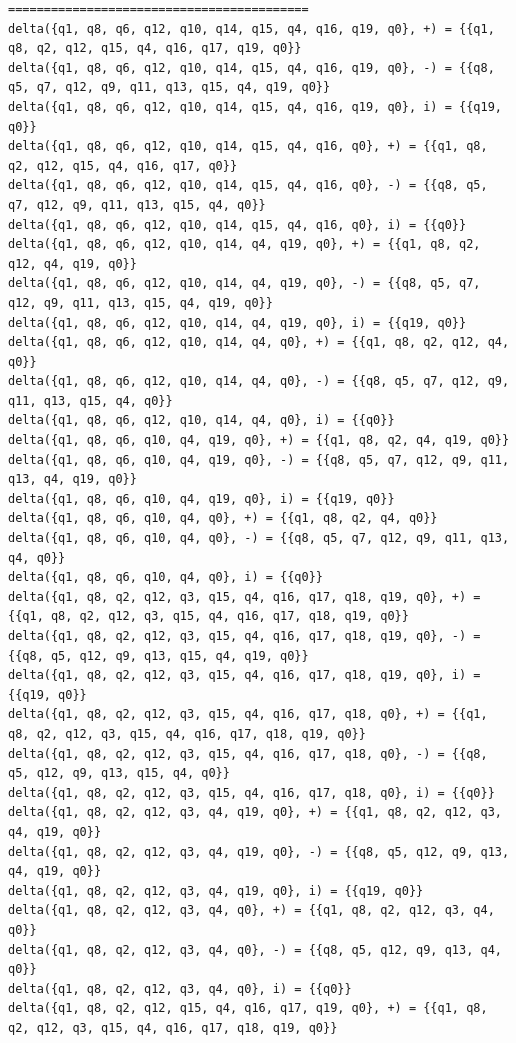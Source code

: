 \documentclass[12pt,a4paper]{report}
\begin{document}
\begin{lstlisting}
==========================================
delta({q1, q8, q6, q12, q10, q14, q15, q4, q16, q19, q0}, +) = {{q1, q8, q2, q12, q15, q4, q16, q17, q19, q0}}
delta({q1, q8, q6, q12, q10, q14, q15, q4, q16, q19, q0}, -) = {{q8, q5, q7, q12, q9, q11, q13, q15, q4, q19, q0}}
delta({q1, q8, q6, q12, q10, q14, q15, q4, q16, q19, q0}, i) = {{q19, q0}}
delta({q1, q8, q6, q12, q10, q14, q15, q4, q16, q0}, +) = {{q1, q8, q2, q12, q15, q4, q16, q17, q0}}
delta({q1, q8, q6, q12, q10, q14, q15, q4, q16, q0}, -) = {{q8, q5, q7, q12, q9, q11, q13, q15, q4, q0}}
delta({q1, q8, q6, q12, q10, q14, q15, q4, q16, q0}, i) = {{q0}}
delta({q1, q8, q6, q12, q10, q14, q4, q19, q0}, +) = {{q1, q8, q2, q12, q4, q19, q0}}
delta({q1, q8, q6, q12, q10, q14, q4, q19, q0}, -) = {{q8, q5, q7, q12, q9, q11, q13, q15, q4, q19, q0}}
delta({q1, q8, q6, q12, q10, q14, q4, q19, q0}, i) = {{q19, q0}}
delta({q1, q8, q6, q12, q10, q14, q4, q0}, +) = {{q1, q8, q2, q12, q4, q0}}
delta({q1, q8, q6, q12, q10, q14, q4, q0}, -) = {{q8, q5, q7, q12, q9, q11, q13, q15, q4, q0}}
delta({q1, q8, q6, q12, q10, q14, q4, q0}, i) = {{q0}}
delta({q1, q8, q6, q10, q4, q19, q0}, +) = {{q1, q8, q2, q4, q19, q0}}
delta({q1, q8, q6, q10, q4, q19, q0}, -) = {{q8, q5, q7, q12, q9, q11, q13, q4, q19, q0}}
delta({q1, q8, q6, q10, q4, q19, q0}, i) = {{q19, q0}}
delta({q1, q8, q6, q10, q4, q0}, +) = {{q1, q8, q2, q4, q0}}
delta({q1, q8, q6, q10, q4, q0}, -) = {{q8, q5, q7, q12, q9, q11, q13, q4, q0}}
delta({q1, q8, q6, q10, q4, q0}, i) = {{q0}}
delta({q1, q8, q2, q12, q3, q15, q4, q16, q17, q18, q19, q0}, +) = {{q1, q8, q2, q12, q3, q15, q4, q16, q17, q18, q19, q0}}
delta({q1, q8, q2, q12, q3, q15, q4, q16, q17, q18, q19, q0}, -) = {{q8, q5, q12, q9, q13, q15, q4, q19, q0}}
delta({q1, q8, q2, q12, q3, q15, q4, q16, q17, q18, q19, q0}, i) = {{q19, q0}}
delta({q1, q8, q2, q12, q3, q15, q4, q16, q17, q18, q0}, +) = {{q1, q8, q2, q12, q3, q15, q4, q16, q17, q18, q19, q0}}
delta({q1, q8, q2, q12, q3, q15, q4, q16, q17, q18, q0}, -) = {{q8, q5, q12, q9, q13, q15, q4, q0}}
delta({q1, q8, q2, q12, q3, q15, q4, q16, q17, q18, q0}, i) = {{q0}}
delta({q1, q8, q2, q12, q3, q4, q19, q0}, +) = {{q1, q8, q2, q12, q3, q4, q19, q0}}
delta({q1, q8, q2, q12, q3, q4, q19, q0}, -) = {{q8, q5, q12, q9, q13, q4, q19, q0}}
delta({q1, q8, q2, q12, q3, q4, q19, q0}, i) = {{q19, q0}}
delta({q1, q8, q2, q12, q3, q4, q0}, +) = {{q1, q8, q2, q12, q3, q4, q0}}
delta({q1, q8, q2, q12, q3, q4, q0}, -) = {{q8, q5, q12, q9, q13, q4, q0}}
delta({q1, q8, q2, q12, q3, q4, q0}, i) = {{q0}}
delta({q1, q8, q2, q12, q15, q4, q16, q17, q19, q0}, +) = {{q1, q8, q2, q12, q3, q15, q4, q16, q17, q18, q19, q0}}

\end{lstlisting}
\end{document}

